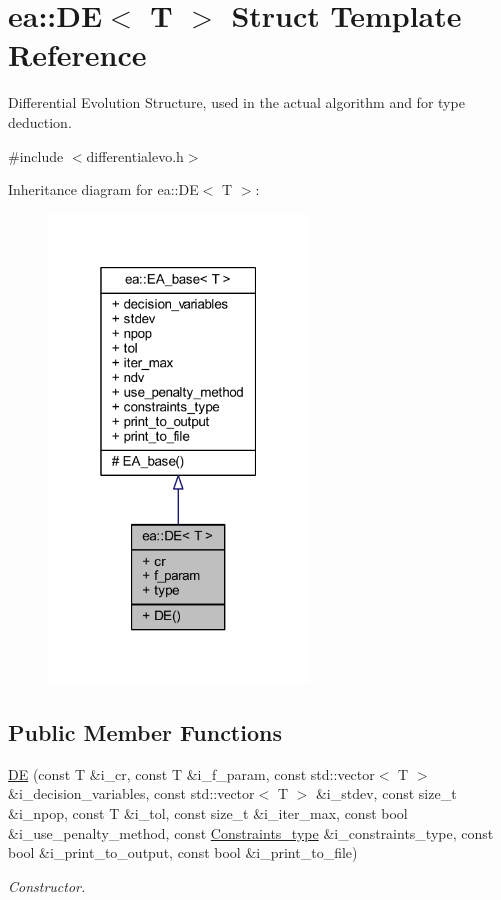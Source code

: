 \hypertarget{structea_1_1_d_e}{}\section{ea\+:\+:DE$<$ T $>$ Struct Template Reference}
\label{structea_1_1_d_e}


Differential Evolution Structure, used in the actual algorithm and for type deduction.  




{\ttfamily \#include $<$differentialevo.\+h$>$}



Inheritance diagram for ea\+:\+:DE$<$ T $>$\+:
\nopagebreak
\begin{figure}[H]
\begin{center}
\leavevmode
\includegraphics[width=196pt]{structea_1_1_d_e__inherit__graph}
\end{center}
\end{figure}
\subsection*{Public Member Functions}
\begin{DoxyCompactItemize}
\item 
\hyperlink{structea_1_1_d_e_a407d0c61464c79e200906e95370f70c4}{DE} (const T \&i\+\_\+cr, const T \&i\+\_\+f\+\_\+param, const std\+::vector$<$ T $>$ \&i\+\_\+decision\+\_\+variables, const std\+::vector$<$ T $>$ \&i\+\_\+stdev, const size\+\_\+t \&i\+\_\+npop, const T \&i\+\_\+tol, const size\+\_\+t \&i\+\_\+iter\+\_\+max, const bool \&i\+\_\+use\+\_\+penalty\+\_\+method, const \hyperlink{namespaceutilities_ab1a1517bf6e62a1acfab5293ca8985c1}{Constraints\+\_\+type} \&i\+\_\+constraints\+\_\+type, const bool \&i\+\_\+print\+\_\+to\+\_\+output, const bool \&i\+\_\+print\+\_\+to\+\_\+file)
\begin{DoxyCompactList}\small\item\em Constructor. \end{DoxyCompactList}\end{DoxyCompactItemize}
